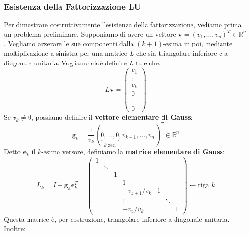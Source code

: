 \subsubsection{Esistenza della Fattorizzazione LU}
Per dimostrare costruttivamente l'esistenza della fattorizzazione, vediamo prima un problema preliminare. Supponiamo di avere un vettore $\mathbf{v} = (v_1, \dots, v_n)^T \in \mathbb{R}^n$. Vogliamo azzerare le sue componenti dalla $(k+1)$-esima in poi, mediante moltiplicazione a sinistra per una matrice $L$ che sia triangolare inferiore e a diagonale unitaria. Vogliamo cioè definire $L$ tale che:
$$ L\mathbf{v} = \begin{pmatrix} v_1 \\ \vdots \\ v_k \\ 0 \\ \vdots \\ 0 \end{pmatrix} $$
Se $v_k \neq 0$, possiamo definire il \textbf{vettore elementare di Gauss}:
$$ \mathbf{g}_k = \frac{1}{v_k} ( \underbrace{0, \dots, 0}_{k \text{ zeri}}, v_{k+1}, \dots, v_n )^T \in \mathbb{R}^n $$
Detto $\mathbf{e}_k$ il $k$-esimo versore, definiamo la \textbf{matrice elementare di Gauss}:
$$ L_k = I - \mathbf{g}_k \mathbf{e}_k^T = 
\begin{pmatrix}
1 & & & & & & \\
& \ddots & & & & & \\
& & 1 & & & & \\
& & & 1 & & & \\
& & & -v_{k+1}/v_k & 1 & & \\
& & & \vdots & & \ddots & \\
& & & -v_n/v_k & & & 1
\end{pmatrix} \leftarrow \text{riga } k
$$
Questa matrice è, per costruzione, triangolare inferiore a diagonale unitaria. Inoltre:

